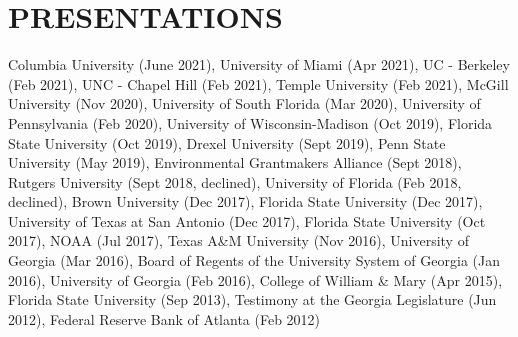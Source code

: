 \documentclass[letterpaper,11pt]{article}
\begin{document}
\section{PRESENTATIONS}
Columbia University (June 2021), University of Miami (Apr 2021), UC - Berkeley (Feb 2021), UNC - Chapel Hill (Feb 2021), Temple University (Feb 2021), McGill University (Nov 2020), University of South Florida (Mar 2020), University of Pennsylvania (Feb 2020), University of Wisconsin-Madison (Oct 2019), Florida State University (Oct 2019), Drexel University (Sept 2019), Penn State University (May 2019), Environmental Grantmakers Alliance (Sept 2018), Rutgers University (Sept 2018, declined), University of Florida (Feb 2018, declined), Brown University (Dec 2017), Florida State University (Dec 2017), University of Texas at San Antonio (Dec 2017), Florida State University (Oct 2017), NOAA (Jul 2017), Texas A\&M University (Nov 2016), University of Georgia (Mar 2016), Board of Regents of the University System of Georgia (Jan 2016), University of Georgia (Feb 2016), College of William \& Mary (Apr 2015), Florida State University (Sep 2013), Testimony at the Georgia Legislature (Jun 2012), Federal Reserve Bank of Atlanta (Feb 2012)

%
%
%
%
\end{document}
